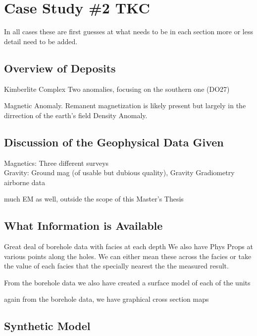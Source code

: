 
\chapter{Case Study \#2 TKC}
\label{ch:CaseStudy1}

In all cases these are first guesses at what needs to be in each section more or less detail need to be added.



\section{Overview of Deposits}
\label{sec:Overview of Deposits:TKC}

Kimberlite Complex
Two anomalies, focusing on the southern one (DO27)

Magnetic Anomaly. Remanent magnetization is likely present but largely in the dirrection of the earth's field
Density Anomaly. 
\section{Discussion of the Geophysical Data Given}
\label{sec:Discussion of the Geophysical Data Given:TKC}

Magnetics: Three different surveys\\
Gravity: Ground mag (of usable but dubious quality), Gravity Gradiometry airborne data

much EM as well, outside the scope of this Master's Thesis

\section{What Information is Available}
\label{sec:What Information is Available:TKC}

Great deal of borehole data with facies at each depth
We also have Phys Props at various points along the holes. We can either mean these across the facies or take the value of each facies that the specially nearest the the measured result.

From the borehole data we also have created a surface model of each of the units

again from the borehole data, we have graphical cross section maps

\section{Synthetic Model}
\label{sec:Synthetic Model:TKC}

